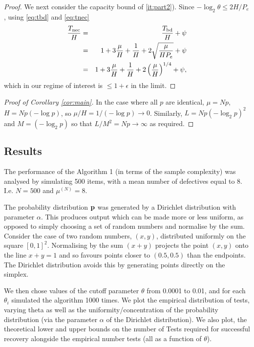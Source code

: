 \begin{proof}
We next consider the capacity bound of \ref{it:part2}).
Since $-\log_2 \theta \leq 2 H/P_e$, using \eqref{eq:tbd}  and \eqref{eq:tnec}
\begin{eqnarray}
\frac{T_{{\rm nec}}}{H} & = & 
 \frac{T_{{\rm bd}}}{H}  + \psi \nonumber\\
&  = & 1 + 3 \frac{\mu}{H} + \frac{1}{H}  + 2 \sqrt{ \frac{ \mu}{H P_e}} + \psi \nonumber \\
& =  & 1 + 3 \frac{\mu}{H} + \frac{1}{H} + 2 \left( \frac{\mu}{H} \right)^{1/4} + \psi, \label{eq:ratio2}
\end{eqnarray}
which in our regime of interest is $\leq 1 + \epsilon$ in the limit.
\end{proof}

\begin{proof}[Proof of Corollary \ref{cor:main}]
In the case where all $p$ are identical, $\mu = N p$, $H  = N p (-\log p)$, so $\mu/H = 1/(-\log p) \rightarrow 0$. Similarly, $L = N p (-\log_2 p)^2$ and $M = ( -\log_2 p)$
so that $L/M^2 = N p \rightarrow \infty$ as required.
\end{proof}









\subsection{Results}
The performance of the Algorithm 1 (in terms of the sample complexity) was analysed by simulating 500 items, with a mean number of defectives equal to 8. I.e. \(N = 500\) and \(\mu^{(N)} = 8\). 

The probability distribution \({\mathbf{ p}}\) was generated by a Dirichlet distribution with parameter $\alpha$.
This produces  output which can be made more or less uniform, as opposed to
 simply choosing a set of random numbers and normalise by the sum. Consider the case of two random numbers, \(\left(x,y\right)\), distributed uniformly on the square \(\left[0,1\right]^2\). Normalising by the sum \(\left(x+y\right)\) projects the point \(\left(x,y\right)\) onto the line \(x+y=1\) and so favours points closer to \((0.5,0.5)\) than the endpoints. The Dirichlet distribution avoids this by generating points directly on the simplex.

We then chose values of the cutoff parameter \(\theta\) from 0.0001 to 0.01, and for each \(\theta_i\) simulated the algorithm 1000 times. We plot the empirical distribution of tests, varying theta as well as the uniformity/concentration of the probability distribution (via the parameter \(\alpha\) of the Dirichlet distribution). We also plot, the theoretical lower and upper bounds on the number of Tests required for successful recovery alongside the empirical number tests (all as a function of \(\theta\)).

